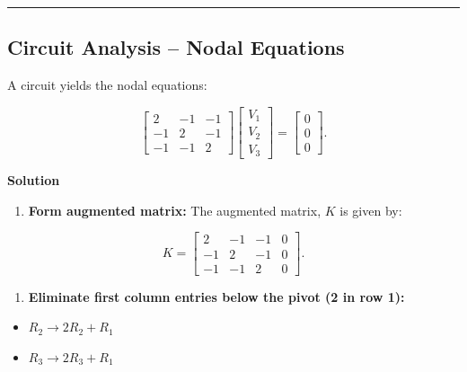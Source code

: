 \documentclass[
  letterpaper,
  DIV=11,
  numbers=noendperiod]{scrreprt}
\providecommand{\tightlist}{%
  \setlength{\itemsep}{0pt}\setlength{\parskip}{0pt}}
\begin{document}
\begin{center}\rule{0.5\linewidth}{0.5pt}\end{center}

\subsection{Circuit Analysis -- Nodal
Equations}\label{circuit-analysis-nodal-equations}

A circuit yields the nodal equations:

\[
\begin{bmatrix}
2 & -1 & -1 \\
-1 & 2 & -1 \\
-1 & -1 & 2
\end{bmatrix}
\begin{bmatrix} V_1 \\ V_2 \\ V_3 \end{bmatrix}
=
\begin{bmatrix} 0 \\ 0 \\ 0 \end{bmatrix}.
\]

\textbf{Solution}

\begin{enumerate}
\def\labelenumi{\arabic{enumi}.}
\tightlist
\item
  \textbf{Form augmented matrix:} The augmented matrix, \(K\) is given
  by:
\end{enumerate}

\[
K=\left[\begin{array}{ccc|c}
2 & -1 & -1 & 0\\
-1 & 2 & -1 & 0\\
-1 & -1 & 2 & 0
\end{array}\right].
\]

\begin{enumerate}
\def\labelenumi{\arabic{enumi}.}
\setcounter{enumi}{1}
\tightlist
\item
  \textbf{Eliminate first column entries below the pivot (2 in row
  1):}\\
\end{enumerate}

\begin{itemize}
\tightlist
\item
  \(R_2 \to 2R_2 + R_1\)\\
\item
  \(R_3 \to 2R_3 + R_1\)
\end{itemize}
\end{document}
